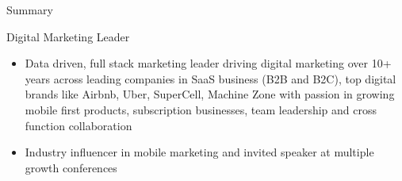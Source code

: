 \documentclass[]{mcdowellcv}
\begin{document}
	\makeheader
	
	\begin{cvsection}{Summary}
	\begin{cvsubsection} {Digital Marketing Leader}{}{}
		\begin{itemize}
		\item Data driven, full stack marketing leader driving digital marketing over 10+ years across leading companies in SaaS business (B2B and B2C), top digital brands like Airbnb, Uber, SuperCell, Machine Zone with passion in growing mobile first products, subscription businesses, team leadership and cross function collaboration
		\item Industry influencer in mobile marketing and invited speaker at multiple growth conferences
		\end{itemize}
	\end{cvsubsection}
	
	\end{cvsection}
	
\end{document}
